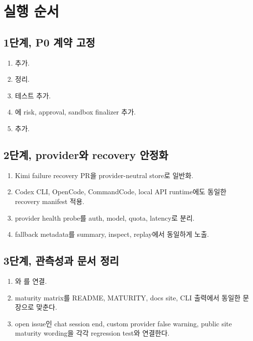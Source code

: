 \documentclass[11pt,a4paper]{article}
\newcommand{\code}[1]{\texttt{\detokenize{#1}}}
\begin{document}
\section{실행 순서}
\subsection{1단계, P0 계약 고정}
\begin{enumerate}
  \item {} 추가.
  \item {} 정리.
  \item {} 테스트 추가.
  \item {}에 risk, approval, sandbox finalizer 추가.
  \item {} 추가.
\end{enumerate}

\subsection{2단계, provider와 recovery 안정화}
\begin{enumerate}
  \item Kimi failure recovery PR을 provider-neutral store로 일반화.
  \item Codex CLI, OpenCode, CommandCode, local API runtime에도 동일한 recovery manifest 적용.
  \item provider health probe를 auth, model, quota, latency로 분리.
  \item fallback metadata를 summary, inspect, replay에서 동일하게 노출.
\end{enumerate}

\subsection{3단계, 관측성과 문서 정리}
\begin{enumerate}
  \item {}와 를 연결.
  \item maturity matrix를 README, MATURITY, docs site, CLI \code{doctor} 출력에서 동일한 문장으로 맞춘다.
  \item open issue인 chat session end, custom provider false warning, public site maturity wording을 각각 regression test와 연결한다.
\end{enumerate}
\end{document}
